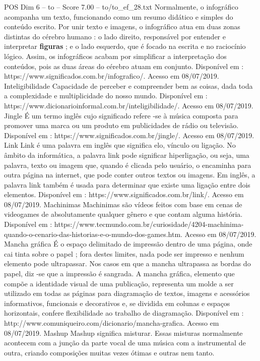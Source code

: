 \begin{textsample}{POS Dim 6 – to – Score 7.00 – to/to\_ef\_28.txt}
Normalmente, o infográfico acompanha um texto, funcionando como um resumo didático e simples do conteúdo escrito.
Por unir texto e imagens, o infográfico atua em duas zonas distintas do cérebro humano : o lado direito, responsável por entender e interpretar \textbf{figuras} ; e o lado esquerdo, que é focado na escrita e no raciocínio lógico.
Assim, os infográficos acabam por simplificar a interpretação dos conteúdos, pois as duas áreas do cérebro atuam em conjunto.
Disponível em : https://www.significados.com.br/infografico/.
Acesso em 08/07/2019.
Inteligibilidade Capacidade de perceber e compreender bem as coisas, dada toda a complexidade e multiplicidade do nosso mundo.
Disponível em : https://www.dicionarioinformal.com.br/inteligibilidade/.
Acesso em 08/07/2019.
Jingle É um termo inglês cujo significado refere -se à música composta para promover uma marca ou um produto em publicidades de rádio ou televisão.
Disponível em : https://www.significados.com.br/jingle/.
Acesso em 08/07/2019.
Link Link é uma palavra em inglês que significa elo, vínculo ou ligação.
No âmbito da informática, a palavra link pode significar hiperligação, ou seja, uma palavra, texto ou imagem que, quando é clicada pelo usuário, o encaminha para outra página na internet, que pode conter outros textos ou imagens.
Em inglês, a palavra link também é usada para determinar que existe uma ligação entre dois elementos.
Disponível em : https://www.significados.com.br/link/.
Acesso em 08/07/2019.
Machinimas Machinimas são vídeos feitos com base em cenas de videogames de absolutamente qualquer gênero e que contam alguma história.
Disponível em : https://www.tecmundo.com.br/curiosidade/4204-machinima-quando-o-cenario-das-historias-e-o-mundo-dos-games.htm.
Acesso em 08/07/2019.
Mancha gráfica É o espaço delimitado de impressão dentro de uma página, onde cai tinta sobre o papel ; fora destes limites, nada pode ser impresso e nenhum elemento pode ultrapassar.
Nos casos em que a mancha ultrapassa as bordas do papel, diz -se que a impressão é sangrada.
A mancha gráfica, elemento que compõe a identidade visual de uma publicação, representa um molde a ser utilizado em todas as páginas para diagramação de textos, imagens e acessórios informativos, funcionais e decorativos e, se dividida em colunas e espaços horizontais, confere flexibilidade ao trabalho de diagramação.
Disponível em : http://www.comuniqueiro.com/dicionario/mancha-grafica.
Acesso em 08/07/2019.
Mashup Mashup significa misturar.
Essas misturas normalmente acontecem com a junção da parte vocal de uma música com a instrumental de outra, criando composições muitas vezes ótimas e outras nem tanto.

\end{textsample}
